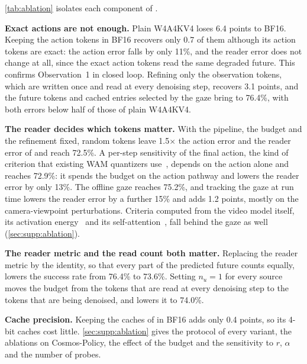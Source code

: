 \cref{tab:ablation} isolates each component of \method.

\noindent\textbf{Exact actions are not enough.}
Plain W4A4KV4 loses 6.4 points to BF16.
Keeping the action tokens in BF16 recovers only 0.7 of them although its action tokens are exact: the action error falls by only 11\%, and the reader error does not change at all, since the exact action tokens read the same degraded future.
This confirms Observation~1 in closed loop.
Refining only the observation tokens, which are written once and read at every denoising step, recovers 3.1 points, and the future tokens and cached entries selected by the gaze bring \method to 76.4\%, with both errors below half of those of plain W4A4KV4.

\noindent\textbf{The reader decides which tokens matter.}
With the pipeline, the budget and the refinement fixed, random tokens leave 1.5$\times$ the action error and the reader error of \method and reach 72.5\%.
A per-step sensitivity of the final action, the kind of criterion that existing WAM quantizers use~\cite{akbari2026qwam,wang2026steerquant}, depends on the action alone and reaches 72.9\%: it spends the budget on the action pathway and lowers the reader error by only 13\%.
The offline gaze reaches 75.2\%, and tracking the gaze at run time lowers the reader error by a further 15\% and adds 1.2 points, mostly on the camera-viewpoint perturbations.
Criteria computed from the video model itself, its activation energy~\cite{federici2026stamp} and its self-attention~\cite{shen2024squat,jang2026semanticdialect}, fall behind the gaze as well (\cref{sec:supp:ablation}).

\noindent\textbf{The reader metric and the read count both matter.}
Replacing the reader metric by the identity, so that every part of the predicted future counts equally, lowers the success rate from 76.4\% to 73.6\%.
Setting $n_u = 1$ for every source moves the budget from the tokens that are read at every denoising step to the tokens that are being denoised, and lowers it to 74.0\%.

\noindent\textbf{Cache precision.}
Keeping the caches of \method in BF16 adds only 0.4 points, so its 4-bit caches cost little.
\cref{sec:supp:ablation} gives the protocol of every variant, the ablations on Cosmos-Policy, the effect of the budget and the sensitivity to $r$, $\alpha$ and the number of probes.

